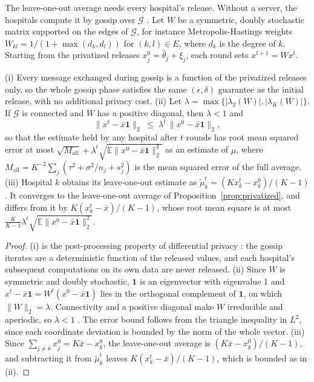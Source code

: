\documentclass[acmsmall,screen,review]{acmart}
\theoremstyle{acmdefinition}
\begin{document}
The leave-one-out average needs every hospital's release. Without a server, the hospitals compute it by gossip over $\mathcal{G}$ \cite{boyd2006randomized,xiao2004fast}. Let $W$ be a symmetric, doubly stochastic matrix supported on the edges of $\mathcal{G}$, for instance Metropolis-Hastings weights $W_{kl}=1/(1+\max(d_k,d_l))$ for $(k,l)\in E$, where $d_k$ is the degree of $k$. Starting from the privatized releases $x_j^0=\hat{\theta}_j+\xi_j$, each round sets $x^{t+1}=Wx^t$.

\begin{proposition}\label{prop:gossip}
(i) Every message exchanged during gossip is a function of the privatized releases only, so the whole gossip phase satisfies the same $(\epsilon,\delta)$ guarantee as the initial release, with no additional privacy cost. (ii) Let $\lambda=\max\{|\lambda_2(W)|,|\lambda_K(W)|\}$. If $\mathcal{G}$ is connected and $W$ has a positive diagonal, then $\lambda<1$ and
\[
\bigl\|x^t-\bar{x}\mathbf{1}\bigr\|_2\;\le\;\lambda^t\,\bigl\|x^0-\bar{x}\mathbf{1}\bigr\|_2,
\]
so that the estimate held by any hospital after $t$ rounds has root mean squared error at most $\sqrt{M_{\mathrm{all}}}+\lambda^t\sqrt{\mathbb{E}\|x^0-\bar{x}\mathbf{1}\|_2^2}$ as an estimate of $\mu$, where $M_{\mathrm{all}}=K^{-2}\sum_{j}(\tau^2+\sigma^2/n_j+s_j^2)$ is the mean squared error of the full average. (iii) Hospital $k$ obtains its leave-one-out estimate as $\tilde{\mu}_k^t=(Kx_k^t-x_k^0)/(K-1)$. It converges to the leave-one-out average of Proposition~\ref{prop:privatized}, and differs from it by $K(x_k^t-\bar{x})/(K-1)$, whose root mean square is at most $\frac{K}{K-1}\lambda^t\sqrt{\mathbb{E}\|x^0-\bar{x}\mathbf{1}\|_2^2}$.
\end{proposition}

\begin{proof}
(i) is the post-processing property of differential privacy \cite{dwork2014algorithmic}: the gossip iterates are a deterministic function of the released values, and each hospital's subsequent computations on its own data are never released. (ii) Since $W$ is symmetric and doubly stochastic, $\mathbf{1}$ is an eigenvector with eigenvalue 1 and $x^t-\bar{x}\mathbf{1}=W^t(x^0-\bar{x}\mathbf{1})$ lies in the orthogonal complement of $\mathbf{1}$, on which $\|W\|_2=\lambda$. Connectivity and a positive diagonal make $W$ irreducible and aperiodic, so $\lambda<1$ \cite{xiao2004fast}. The error bound follows from the triangle inequality in $L^2$, since each coordinate deviation is bounded by the norm of the whole vector. (iii) Since $\sum_{j\neq k}x_j^0=K\bar{x}-x_k^0$, the leave-one-out average is $(K\bar{x}-x_k^0)/(K-1)$, and subtracting it from $\tilde{\mu}_k^t$ leaves $K(x_k^t-\bar{x})/(K-1)$, which is bounded as in (ii).
\end{proof}
\end{document}
